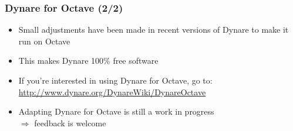 \documentclass{beamer}
\begin{document}
\begin{frame}
  \frametitle{Dynare for Octave (2/2)}
  \begin{itemize}
  \item Small adjustments have been made in recent versions of Dynare to make it run on Octave
  \item This makes Dynare 100\% free software
  \item If you're interested in using Dynare for Octave, go to: \\
    \url{http://www.dynare.org/DynareWiki/DynareOctave}
  \item Adapting Dynare for Octave is still a work in progress \\
    $\Rightarrow$ feedback is welcome
  \end{itemize}
\end{frame}
\end{document}

